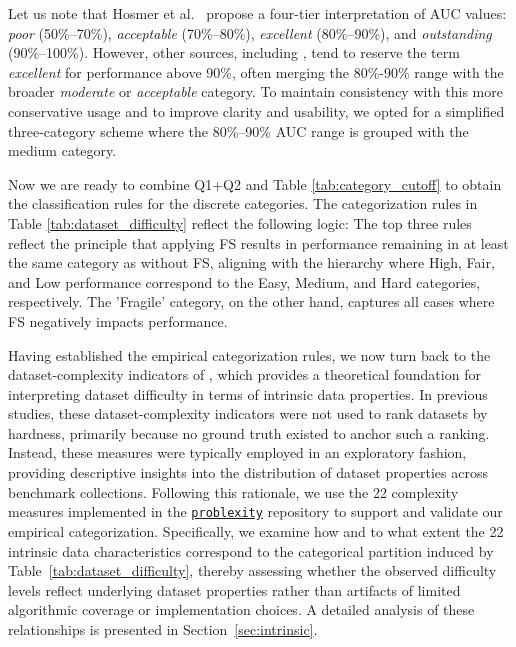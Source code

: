 \documentclass[preprint,12pt,authoryear]{elsarticle}
\begin{document}
Let us note that Hosmer et al.~\cite{hosmer2013applied} propose a four-tier interpretation of AUC values: \textit{poor} (50\%--70\%), \textit{acceptable} (70\%--80\%), \textit{excellent} (80\%--90\%), and \textit{outstanding} (90\%--100\%). However, other sources, including \cite{corbacioglu2023roc,Jim_nez_Valverde_2011,lavazza2023reliability}, tend to reserve the term \textit{excellent} for performance above 90\%, often merging the 80\%-90\% range with the broader \textit{moderate} or \textit{acceptable} category. To maintain consistency with this more conservative usage and to improve clarity and usability, we opted for a simplified three-category scheme where the 80\%--90\% AUC range is grouped with the medium category.


Now we are ready to combine Q1+Q2 and Table \ref{tab:category_cutoff} to obtain the classification rules for the discrete categories. The categorization rules in Table \ref{tab:dataset_difficulty} reflect the following logic: The top three rules reflect the principle that applying FS results in performance remaining in at least the same category as without FS, aligning with the hierarchy where High, Fair, and Low performance correspond to the Easy, Medium, and Hard categories, respectively. The 'Fragile' category, on the other hand, captures all cases where FS negatively impacts performance.

Having established the empirical categorization rules, we now turn back to the dataset-complexity indicators of \cite{ho2002complexity}, which provides a theoretical foundation for interpreting dataset difficulty in terms of intrinsic data properties. In previous studies, these dataset-complexity indicators were not used to rank datasets by hardness, primarily because no ground truth existed to anchor such a ranking. Instead, these measures were typically employed in an exploratory fashion, providing descriptive insights into the distribution of dataset properties across benchmark collections. Following this rationale, we use the 22 complexity measures implemented in the \href{https://github.com/w4k2/problexity?utm_source=chatgpt.com}{\texttt{problexity}} repository \cite{problexity} to support and validate our empirical categorization. Specifically, we examine how and to what extent the 22 intrinsic data characteristics correspond to the categorical partition induced by Table~\ref{tab:dataset_difficulty}, thereby assessing whether the observed difficulty levels reflect underlying dataset properties rather than artifacts of limited algorithmic coverage or implementation choices. A detailed analysis of these relationships is presented in Section~\ref{sec:intrinsic}.
\end{document}
